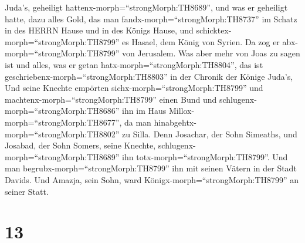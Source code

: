 Juda's, geheiligt hattenx-morph=``strongMorph:TH8689'', und was er
geheiligt hatte, dazu alles Gold, das man
fandx-morph=``strongMorph:TH8737'' im Schatz in des HERRN Hause und in
des Königs Hause, und schicktex-morph=``strongMorph:TH8799'' es Hasael,
dem König von Syrien. Da zog er abx-morph=``strongMorph:TH8799'' von
Jerusalem.  Was aber mehr von Joas zu sagen ist und alles,
was er getan hatx-morph=``strongMorph:TH8804'', das ist
geschriebenx-morph=``strongMorph:TH8803'' in der Chronik der Könige
Juda's,  Und seine Knechte empörten
sichx-morph=``strongMorph:TH8799'' und
machtenx-morph=``strongMorph:TH8799'' einen Bund und
schlugenx-morph=``strongMorph:TH8686'' ihn im Haus
Millox-morph=``strongMorph:TH8677'', da man
hinabgehtx-morph=``strongMorph:TH8802'' zu Silla.  Denn
Josachar, der Sohn Simeaths, und Josabad, der Sohn Somers, seine
Knechte, schlugenx-morph=``strongMorph:TH8689'' ihn
totx-morph=``strongMorph:TH8799''. Und man
begrubx-morph=``strongMorph:TH8799'' ihn mit seinen Vätern in der Stadt
Davids. Und Amazja, sein Sohn, ward Königx-morph=``strongMorph:TH8799''
an seiner Statt.

\hypertarget{section-12}{%
\section{13}\label{section-12}}

